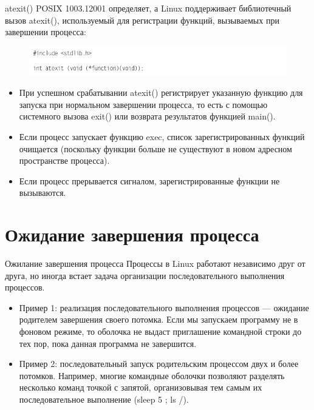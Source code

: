 \documentclass{beamer}
\begin{document}
\begin{frame}{atexit()}
POSIX 1003.1­2001 определяет, а Linux поддерживает библиотечный вызов atexit(),
используемый для регистрации функций, вызываемых при завершении процесса:
\begin{figure}[h]
\centering
\includegraphics[scale=0.5]{images/lec07-pic11.png}
\end{figure}
\begin{itemize}
\item При успешном срабатывании atexit() регистрирует указанную функцию для
запуска при нормальном завершении процесса, то есть с помощью системного
вызова exit() или возврата результатов функцией main(). 
\item Если процесс запускает функцию exec, список зарегистрированных функций очищается (поскольку функции больше не существуют в новом адресном пространстве процесса). 
\item Если процесс прерывается сигналом, зарегистрированные функции не вызываются.
\end{itemize}
\end{frame}

\section{Ожидание завершения процесса}

\begin{frame}{Ожилание завершения процесса}
Процессы в Linux работают независимо друг от друга, но иногда встает задача организации последовательного выполнения процессов.
\begin{itemize}
\item Пример 1: реализация последовательного выполнения процессов — ожидание родителем завершения своего потомка. Если мы запускаем программу не в фоновом режиме, то оболочка не выдаст приглашение командной строки до тех пор, пока данная программа не завершится.
\item Пример 2: последовательный запуск родительским процессом двух и
более потомков. Например, многие командные оболочки позволяют разделять несколько команд точкой с запятой, организовывая тем самым их последовательное
выполнение (sleep 5 ; ls /).
\end{itemize}
\end{frame}
\end{document}
